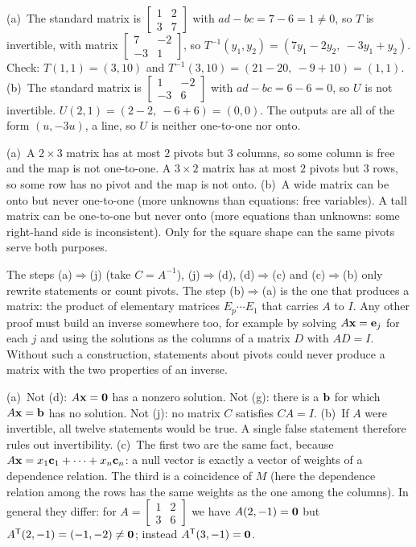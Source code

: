 \documentclass[11pt]{article}
\begin{document}
\begin{description}[leftmargin=0pt,itemsep=5pt]
  \item[Knowledge Check \ref{kc:tinverse}.] (a)~The standard matrix is $\begin{bmatrix}1&2\\3&7\end{bmatrix}$ with $ad-bc=7-6=1\neq0$, so $T$ is invertible, with matrix $\begin{bmatrix}7&-2\\-3&1\end{bmatrix}$, so $T^{-1}(y_1,y_2)=(7y_1-2y_2,\ -3y_1+y_2)$. Check: $T(1,1)=(3,10)$ and $T^{-1}(3,10)=(21-20,\ -9+10)=(1,1)$. (b)~The standard matrix is $\begin{bmatrix}1&-2\\-3&6\end{bmatrix}$ with $ad-bc=6-6=0$, so $U$ is not invertible. $U(2,1)=(2-2,\ -6+6)=(0,0)$. The outputs are all of the form $(u,-3u)$, a line, so $U$ is neither one-to-one nor onto.
  \item[Pause and think \ref{think:shapes}.] (a)~A $2\times3$ matrix has at most $2$ pivots but $3$ columns, so some column is free and the map is not one-to-one. A $3\times2$ matrix has at most $2$ pivots but $3$ rows, so some row has no pivot and the map is not onto. (b)~A wide matrix can be onto but never one-to-one (more unknowns than equations: free variables). A tall matrix can be one-to-one but never onto (more equations than unknowns: some right-hand side is inconsistent). Only for the square shape can the same pivots serve both purposes.
  \item[Pause and think \ref{think:circle}.] The steps (a)$\Rightarrow$(j) (take $C=A^{-1}$), (j)$\Rightarrow$(d), (d)$\Rightarrow$(c) and (c)$\Rightarrow$(b) only rewrite statements or count pivots. The step (b)$\Rightarrow$(a) is the one that produces a matrix: the product of elementary matrices $E_p\cdots E_1$ that carries $A$ to $I$. Any other proof must build an inverse somewhere too, for example by solving $A\mathbf{x}=\mathbf{e}_j$ for each $j$ and using the solutions as the columns of a matrix $D$ with $AD=I$. Without such a construction, statements about pivots could never produce a matrix with the two properties of an inverse.
  \item[Pause and think \ref{think:negate}.] (a)~Not (d): $A\mathbf{x}=\mathbf{0}$ has a nonzero solution. Not (g): there is a $\mathbf{b}$ for which $A\mathbf{x}=\mathbf{b}$ has no solution. Not (j): no matrix $C$ satisfies $CA=I$. (b)~If $A$ were invertible, all twelve statements would be true. A single false statement therefore rules out invertibility. (c)~The first two are the same fact, because $A\mathbf{x}=x_1\mathbf{c}_1+\cdots+x_n\mathbf{c}_n$: a null vector is exactly a vector of weights of a dependence relation. The third is a coincidence of $M$ (here the dependence relation among the rows has the same weights as the one among the columns). In general they differ: for $A=\begin{bmatrix}1&2\\3&6\end{bmatrix}$ we have $A(2,-1)=\mathbf{0}$ but $A^{\mathsf T}(2,-1)=(-1,-2)\neq\mathbf{0}$; instead $A^{\mathsf T}(3,-1)=\mathbf{0}$.

\end{description}
\end{document}

